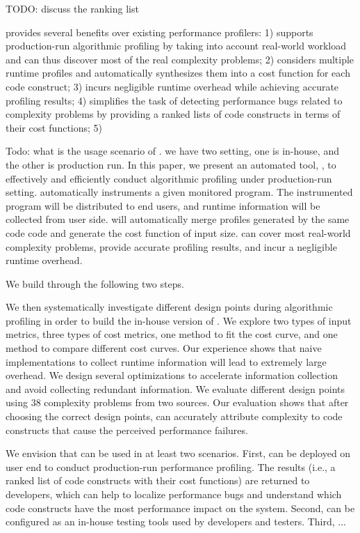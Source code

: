 {\color{red} TODO: discuss the ranking list}

\Tool provides several benefits over existing performance profilers:
1) \Tool supports production-run algorithmic profiling by taking into account
real-world workload and can thus discover most of the real complexity problems;
2) \Tool considers multiple runtime profiles and automatically synthesizes them
into a cost function for each code construct;
3) \Tool incurs negligible runtime overhead while achieving accurate profiling results;
4) \Tool  simplifies the task of detecting performance bugs related to complexity
problems by providing a ranked lists of code constructs in terms of their
cost functions; 
5) 


{\color{red} Todo: what is the usage scenario of \Tool. we have two setting, one is in-house, and the other is production run. }
In this paper,
we present an automated tool, \Tool, to effectively and efficiently conduct algorithmic profiling 
under production-run setting.
\Tool automatically instruments a given monitored program.
The instrumented program will be distributed to end users, 
and runtime information will be collected from user side. 
\Tool will automatically merge profiles generated by the same code code 
and generate the cost function of input size. 
\Tool can cover most real-world complexity problems, 
provide accurate profiling results, and incur a negligible runtime overhead. 

We build \Tool through the following two steps.

We then systematically investigate different design points during algorithmic profiling
in order to build the in-house version of \Tool.
We explore two types of input metrics,
three types of cost metrics,
one method to fit the cost curve,
and one method to compare different cost curves.
Our experience shows that naive implementations
to collect runtime information
will lead to extremely large overhead.
We design several optimizations to accelerate information collection
and avoid collecting redundant information.
We evaluate different design points
using $38$ complexity problems from two sources.
Our evaluation shows that after choosing the correct design points,
\Tool can accurately attribute complexity to code constructs
that cause the perceived performance failures.
\fi


We envision that \Tool can be used in at least two scenarios. 
First, \Tool can be deployed on user end to conduct production-run performance
profiling. The results (i.e., a ranked list of code constructs with their cost functions)
are returned to developers, which can help to localize performance 
bugs and understand 
which code constructs have the most performance impact on the system.
Second, \Tool can be configured as an in-house testing tools used by 
developers and testers. 
Third, ... 


